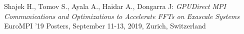 
		Shajek H., Tomov S., Ayala A., Haidar A., Dongarra J: {\sl GPUDirect MPI Communications and Optimizations to Accelerate FFTs on Exascale Systems}
		EuroMPI ’19 Posters, September 11-13, 2019, Zurich, Switzerland
